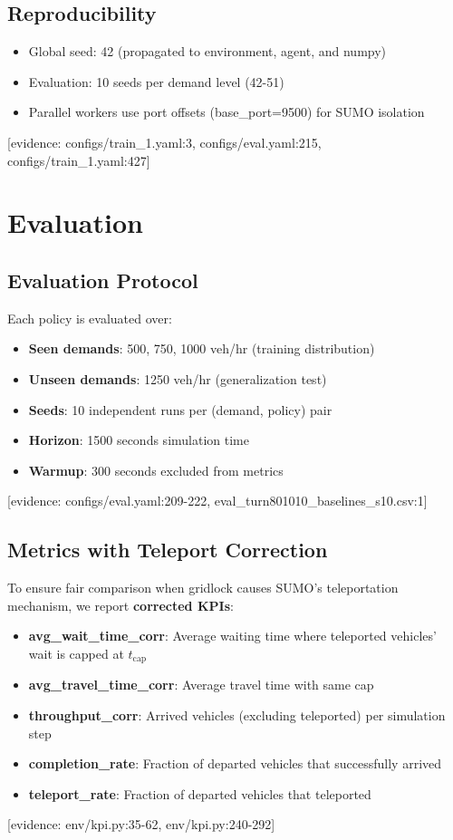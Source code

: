 \subsection{Reproducibility}

\begin{itemize}
    \item Global seed: 42 (propagated to environment, agent, and numpy)
    \item Evaluation: 10 seeds per demand level (42-51)
    \item Parallel workers use port offsets (base\_port=9500) for SUMO isolation
\end{itemize}
[evidence: configs/train\_1.yaml:3, configs/eval.yaml:215, configs/train\_1.yaml:427]


\section{Evaluation}
\label{sec:evaluation}

\subsection{Evaluation Protocol}

Each policy is evaluated over:
\begin{itemize}
    \item \textbf{Seen demands}: 500, 750, 1000 veh/hr (training distribution)
    \item \textbf{Unseen demands}: 1250 veh/hr (generalization test)
    \item \textbf{Seeds}: 10 independent runs per (demand, policy) pair
    \item \textbf{Horizon}: 1500 seconds simulation time
    \item \textbf{Warmup}: 300 seconds excluded from metrics
\end{itemize}
[evidence: configs/eval.yaml:209-222, eval\_turn801010\_baselines\_s10.csv:1]

\subsection{Metrics with Teleport Correction}

To ensure fair comparison when gridlock causes SUMO's teleportation mechanism, we report \textbf{corrected KPIs}:

\begin{itemize}
    \item \textbf{avg\_wait\_time\_corr}: Average waiting time where teleported vehicles' wait is capped at $t_{\text{cap}}$
    \item \textbf{avg\_travel\_time\_corr}: Average travel time with same cap
    \item \textbf{throughput\_corr}: Arrived vehicles (excluding teleported) per simulation step
    \item \textbf{completion\_rate}: Fraction of departed vehicles that successfully arrived
    \item \textbf{teleport\_rate}: Fraction of departed vehicles that teleported
\end{itemize}
[evidence: env/kpi.py:35-62, env/kpi.py:240-292]

